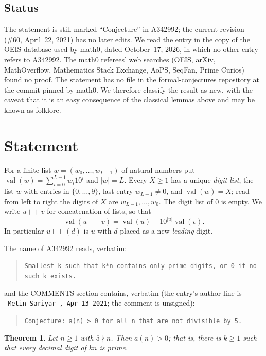 \documentclass[11pt]{amsart}
\theoremstyle{plain}
\newtheorem{theorem}{Theorem}
\theoremstyle{definition}
\newcommand{\val}{\operatorname{val}}
\begin{document}
\subsection*{Status}
The statement is still marked ``Conjecture'' in A342992; the current revision (\#60, April~22, 2021) has no later edits. We read the entry in the copy of the OEIS database used by math0, dated October~17, 2026, in which no other entry refers to A342992. The math0 referees' web searches (OEIS, arXiv, MathOverflow, Mathematics Stack Exchange, AoPS, SeqFan, Prime Curios) found no proof. The statement has no file in the formal-conjectures repository \cite{FC} at the commit pinned by math0. We therefore classify the result as new, with the caveat that it is an easy consequence of the classical lemmas above and may be known as folklore.

\section{Statement}\label{sec:statement}

For a finite list $w=(w_0,\dots,w_{L-1})$ of natural numbers put $\val(w)=\sum_{i=0}^{L-1}w_i10^i$ and $|w|=L$. Every $X\ge1$ has a unique \emph{digit list}, the list $w$ with entries in $\{0,\dots,9\}$, last entry $w_{L-1}\ne0$, and $\val(w)=X$; read from left to right the digits of $X$ are $w_{L-1},\dots,w_0$. The digit list of $0$ is empty. We write $u\mathbin{+\!\!+}v$ for concatenation of lists, so that
\begin{equation}\label{eq:append}
  \val(u\mathbin{+\!\!+}v)=\val(u)+10^{|u|}\val(v).
\end{equation}
In particular $u\mathbin{+\!\!+}(d)$ is $u$ with $d$ placed as a new \emph{leading} digit.

The name of A342992 \cite{A342992} reads, verbatim:
\begin{quote}\raggedright
{\small\texttt{Smallest k such that k*n contains only prime digits, or 0 if no such k exists.}}
\end{quote}
and the COMMENTS section contains, verbatim (the entry's author line is \texttt{\_Metin Sariyar\_, Apr 13 2021}; the comment is unsigned):
\begin{quote}
{\small\texttt{Conjecture: a(n) > 0 for all n that are not divisible by 5.}}
\end{quote}

\begin{theorem}\label{thm:main}
Let $n\ge1$ with $5\nmid n$. Then $a(n)>0$; that is, there is $k\ge1$ such that every decimal digit of $kn$ is prime.
\end{theorem}
\end{document}
